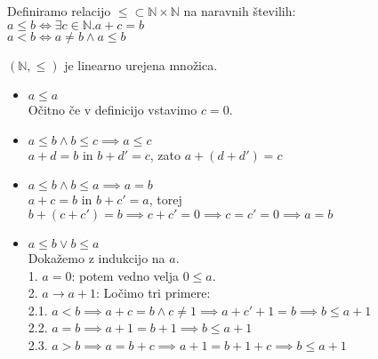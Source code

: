 \begin{definicija}
    Definiramo relacijo $\leq \subset \mathbb{N} \times \mathbb{N}$ na naravnih številih: \\
    $a \leq b \iff \exists c \in \mathbb{N}. a + c = b$ \\
    $a < b \iff a \neq b \wedge a \leq b$
\end{definicija}

\begin{trditev}
    $(\mathbb{N}, \leq)$ je linearno urejena množica.
\end{trditev}
\begin{dokaz}
    \begin{itemize}
        \item $a \leq a$ \\
        Očitno če v definicijo vstavimo $c = 0$.
        \item $a \leq b \wedge b \leq c \implies a \leq c$ \\
        $a + d = b$ in $b + d' = c$, zato $a + (d + d') = c$
        \item $a \leq b \wedge b \leq a \implies a = b$ \\
        $a + c = b$ in $b + c' = a$, torej $b + (c + c') = b \implies c + c' = 0 \implies c = c' = 0 \implies a = b$
        \item $a \leq b \vee b \leq a$ \\
        Dokažemo z indukcijo na $a$. \\
        1. $a = 0$: potem vedno velja $0 \leq a$. \\
        2. $a \to a + 1$: Ločimo tri primere: \\
        2.1. $a < b \implies a + c = b \wedge c \neq 1 \implies a + c' + 1 = b \implies b \leq a + 1$ \\
        2.2. $a = b \implies a + 1 = b + 1 \implies b \leq a + 1$ \\
        2.3. $a > b \implies a = b + c \implies a + 1 = b + 1 + c \implies b \leq a + 1$
    \end{itemize}
\end{dokaz}



